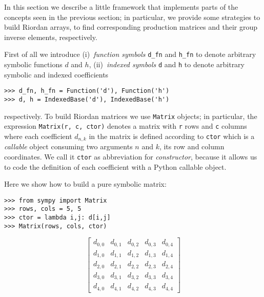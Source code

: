 In this section we describe a little framework that implements parts
of the concepts seen in the previous section; in particular, we provide
some strategies to build Riordan arrays, to find corresponding production
matrices and their group inverse elements, respectively.

First of all we introduce (i)~\textit{function symbols} \verb|d_fn| and
\verb|h_fn| to denote arbitrary symbolic functions $d$ and $h$,
(ii)~\textit{indexed symbols} \verb|d| and \verb|h| to denote arbitrary
symbolic and indexed coefficients
\begin{verbatim}
>>> d_fn, h_fn = Function('d'), Function('h')
>>> d, h = IndexedBase('d'), IndexedBase('h')
\end{verbatim}
respectively. To build Riordan matrices we use \verb|Matrix| objects; in
particular, the expression \verb|Matrix(r, c, ctor)| denotes a matrix with
\verb|r| rows and \verb|c| columns where each coefficient $d_{n,k}$ in the
matrix is defined according to \verb|ctor| which is a \textit{callable}
 object consuming two arguments $n$ and $k$, its row and column
coordinates.  We call it \verb|ctor| as abbreviation for \textit{constructor},
because it allows us to code the definition of each coefficient with a Python
callable object.

Here we show how to build a pure symbolic matrix:
\begin{verbatim}
>>> from sympy import Matrix
>>> rows, cols = 5, 5
>>> ctor = lambda i,j: d[i,j]
>>> Matrix(rows, cols, ctor)
\end{verbatim}
\begin{displaymath}
\left[\begin{matrix}d_{0,0} & d_{0,1} & d_{0,2} & d_{0,3} & d_{0,4}\\d_{1,0} & d_{1,1} & d_{1,2} & d_{1,3} & d_{1,4}\\d_{2,0} & d_{2,1} & d_{2,2} & d_{2,3} & d_{2,4}\\d_{3,0} & d_{3,1} & d_{3,2} & d_{3,3} & d_{3,4}\\d_{4,0} & d_{4,1} & d_{4,2} & d_{4,3} & d_{4,4}\end{matrix}\right]
\end{displaymath}

